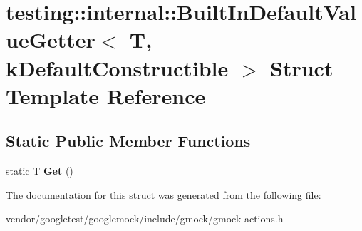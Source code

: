 \hypertarget{structtesting_1_1internal_1_1_built_in_default_value_getter}{}\section{testing\+:\+:internal\+:\+:Built\+In\+Default\+Value\+Getter$<$ T, k\+Default\+Constructible $>$ Struct Template Reference}
\label{structtesting_1_1internal_1_1_built_in_default_value_getter}
\subsection*{Static Public Member Functions}
\begin{DoxyCompactItemize}
\item 
\mbox{\label{structtesting_1_1internal_1_1_built_in_default_value_getter_a61c47c50cdb6ab488dabe2cec3b97fc8}} 
static T {\bfseries Get} ()
\end{DoxyCompactItemize}


The documentation for this struct was generated from the following file\+:\begin{DoxyCompactItemize}
\item 
vendor/googletest/googlemock/include/gmock/gmock-\/actions.\+h\end{DoxyCompactItemize}
